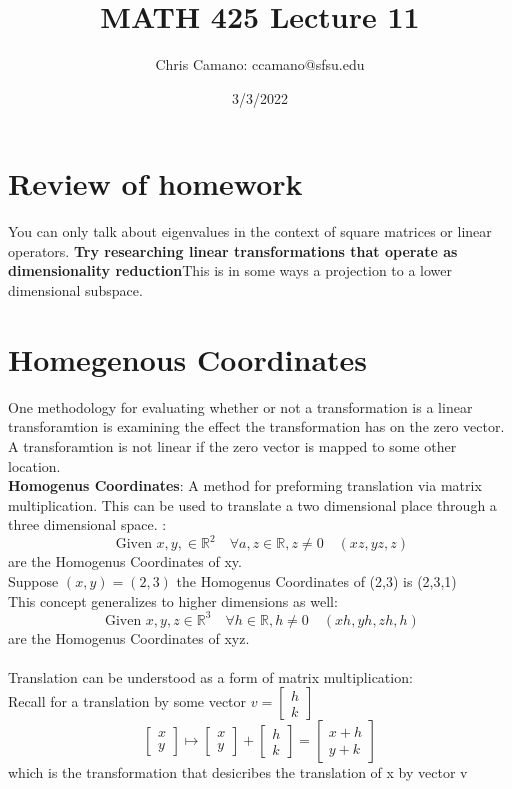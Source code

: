 \documentclass[12pt]{article}
\author{Chris Camano: ccamano@sfsu.edu}
\title{MATH 425  Lecture 11 }
\date{3/3/2022}
\newcommand{\sect}[1]{\section*{#1}}
\newcommand{\R}{\mathbb{R}}
\begin{document}
\maketitle
\sect{Review of homework}
You can only talk about eigenvalues in the context of square matrices or linear operators.
\textbf{Try researching linear transformations that operate as dimensionality reduction}This is in some ways a projection to a lower dimensional subspace.

\sect{Homegenous Coordinates}
One methodology for evaluating whether or not a transformation is a linear transforamtion is examining the effect the transformation has on the zero vector. A transforamtion is not linear if the zero vector is mapped to some other location. \\
\textbf{Homogenus Coordinates}: A method for preforming translation via matrix multiplication. This can be used to translate a two dimensional place through a three dimensional space. :
\[
  \text{ Given }x,y,\in \R^2\quad  \forall a,z \in \R, z\neq 0 \quad (xz,yz,z)
\]
are the Homogenus Coordinates of xy.
\newcommand{\hg}{Homogenus Coordinates }
\\Suppose $(x,y)=(2,3)$ the \hg of (2,3) is (2,3,1)
\\ This concept generalizes to higher dimensions as well:
\[
    \text{ Given }x,y,z\in \R^3\quad  \forall h\in \R, h\neq 0 \quad (xh,yh,zh,h)
\]
are the Homogenus Coordinates of xyz.\\
\\
Translation can be understood as a form of matrix multiplication: \\
Recall for a translation by some vector $v=\begin{bmatrix}
  h\\k
\end{bmatrix}$
\[
  \begin{bmatrix}
    x\\y
  \end{bmatrix}
  \mapsto
  \begin{bmatrix}
    x\\y
  \end{bmatrix}+
  \begin{bmatrix}
    h\\k
  \end{bmatrix}=
  \begin{bmatrix}
    x+h\\y+k
  \end{bmatrix}
\]
which is the transformation that desicribes the translation of x by vector v\\
\end{document}
